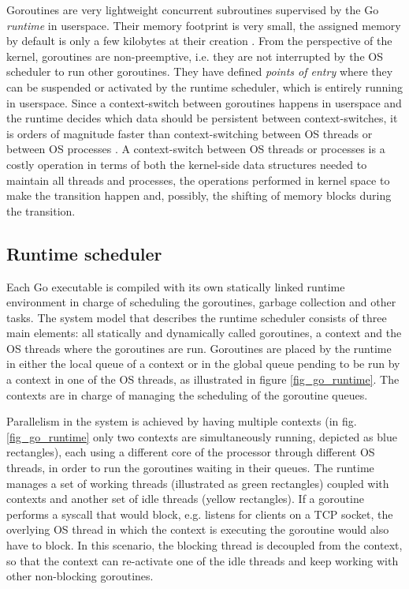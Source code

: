Goroutines are very lightweight concurrent subroutines  supervised by the Go \textit{runtime} in userspace. Their memory footprint is very small, the assigned memory by default is only a few kilobytes at their creation \cite{Cox-Buday2017}. From the perspective of the kernel, goroutines are non-preemptive, i.e. they are not interrupted by the OS scheduler to run other goroutines. They have defined \textit{points of entry} where they can be suspended or activated by the runtime scheduler, which is entirely running in userspace. Since a context-switch between goroutines happens in userspace and the runtime decides which data should be persistent between context-switches, it is orders of magnitude faster than context-switching between OS threads \cite{Cox-Buday2017} or between OS processes \cite{Kerrisk2010}. A context-switch between OS threads or processes is a costly operation in terms of both the kernel-side data structures needed to maintain all threads and processes, the operations performed in kernel space to make the transition happen and, possibly, the shifting of memory blocks during the transition.

\subsection{Runtime scheduler}
Each Go executable is compiled with its own statically linked runtime environment in charge of scheduling the goroutines, garbage collection and other tasks. The system model that describes the runtime scheduler consists of three main elements: all statically and dynamically called goroutines, a context and the OS threads where the goroutines are run. Goroutines are placed by the runtime in either the local queue of a context or in the global queue pending to be run by a context in one of the OS threads, as illustrated in figure \ref{fig_go_runtime}. The contexts are in charge of managing the scheduling of the goroutine queues.

Parallelism in the system is achieved by having multiple contexts (in fig. \ref{fig_go_runtime} only two contexts are simultaneously running, depicted as blue rectangles), each using a different core of the processor through different OS threads, in order to run the  goroutines waiting in their queues. The runtime manages a set of working threads (illustrated as green rectangles) coupled with contexts and another set of idle threads (yellow rectangles).  If a goroutine performs a syscall that would block, e.g. listens for clients on a TCP socket, the overlying OS thread in which the context is executing the goroutine would also have to block. In this scenario, the blocking thread is decoupled from the context, so that the context can re-activate one of the idle threads and keep working with other non-blocking goroutines.

